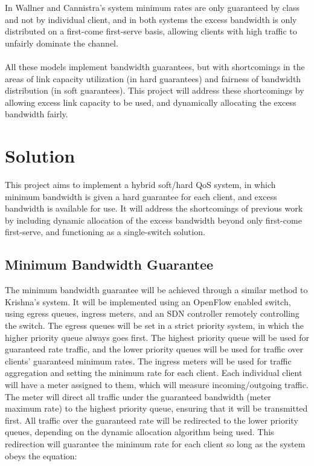 \documentclass[accepted,single]{gipaper}
\begin{document}
In Wallner and Cannistra's \cite{Wallner:2013} system minimum rates are only guaranteed by class and not by individual client, and in both systems the excess bandwidth is only distributed on a first-come first-serve basis, allowing clients with high traffic to unfairly dominate the channel.
\\\\
All these models implement bandwidth guarantees, but with shortcomings in the areas of link capacity utilization (in hard guarantees) and fairness of bandwidth distribution (in soft guarantees). This project will address these shortcomings by allowing excess link capacity to be used, and dynamically allocating the excess bandwidth fairly.

\section{Solution}
\label{solution}

This project aims to implement a hybrid soft/hard QoS system, in which minimum bandwidth is given a hard guarantee for each client, and excess bandwidth is available for use. It will address the shortcomings of previous work by including dynamic allocation of the excess bandwidth beyond only first-come first-serve, and functioning as a single-switch solution.

\subsection{Minimum Bandwidth Guarantee}
\label{sol_min_band}

The minimum bandwidth guarantee will be achieved through a similar method to Krishna’s \cite{Krishna:2016} system. It will be implemented using an OpenFlow enabled switch, using egress queues, ingress meters, and an SDN controller remotely controlling the switch. The egress queues will be set in a strict priority system, in which the higher priority queue always goes first. The highest priority queue will be used for guaranteed rate traffic, and the lower priority queues will be used for traffic over clients’ guaranteed minimum rates. The ingress meters will be used for traffic aggregation and setting the minimum rate for each client. Each individual client will have a meter assigned to them, which will measure incoming/outgoing traffic. The meter will direct all traffic under the guaranteed bandwidth (meter maximum rate) to the highest priority queue, ensuring that it will be transmitted first. All traffic over the guaranteed rate will be redirected to the lower priority queues, depending on the dynamic allocation algorithm being used. This redirection will guarantee the minimum rate for each client so long as the system obeys the equation:
\end{document}
